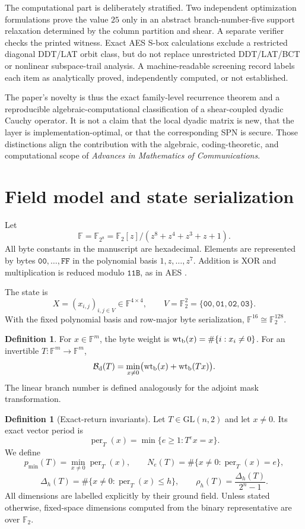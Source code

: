 \documentclass[10pt,reqno]{amsart}
\theoremstyle{plain}
\theoremstyle{remark}\newtheorem{remark}[theorem]{Remark}
\theoremstyle{definition}\newtheorem{definition}[theorem]{Definition}
\newcommand{\F}{\mathbb F}
\newcommand{\wt}{\operatorname{wt}}
\newcommand{\hex}[1]{\mathtt{#1}}
\newcommand{\Bn}{\mathcal B}
\begin{document}
The computational part is deliberately stratified.  Two independent optimization formulations prove the value \(25\) only in an abstract branch-number-five support relaxation determined by the column partition and shear.  A separate verifier checks the printed witness.  Exact AES S-box calculations exclude a restricted diagonal DDT/LAT orbit class, but do not replace unrestricted DDT/LAT/BCT or nonlinear subspace-trail analysis.  A machine-readable screening record labels each item as analytically proved, independently computed, or not established.

The paper's novelty is thus the exact family-level recurrence theorem and a reproducible algebraic-computational classification of a shear-coupled dyadic Cauchy operator.  It is not a claim that the local dyadic matrix is new, that the layer is implementation-optimal, or that the corresponding SPN is secure.  Those distinctions align the contribution with the algebraic, coding-theoretic, and computational scope of \emph{Advances in Mathematics of Communications}.
\section{Field model and state serialization}
Let
\[
\F=\F_{2^8}=\F_2[z]/(z^8+z^4+z^3+z+1).
\]
All byte constants in the manuscript are hexadecimal. Elements are represented by bytes $\hex{00},\ldots,\hex{FF}$ in the polynomial basis $1,z,\ldots,z^7$. Addition is XOR and multiplication is reduced modulo $\hex{11B}$, as in AES \cite{FIPS197,DaemenRijmen2002,DaemenRijmenWide2001}.

The state is
\[
X=(x_{i,j})_{i,j\in V}\in\F^{4\times4},\qquad V=\F_2^2=\{\hex{00},\hex{01},\hex{02},\hex{03}\}.
\]
With the fixed polynomial basis and row-major byte serialization, $\F^{16}\cong\F_2^{128}$.

\begin{definition}
For $x\in\F^m$, the byte weight is $\wt_{\rm b}(x)=\#\{i:x_i\ne0\}$. For an invertible $T:\F^m\to\F^m$,
\[
\Bn_{\rm d}(T)=\min_{x\ne0}\bigl(\wt_{\rm b}(x)+\wt_{\rm b}(Tx)\bigr).
\]
The linear branch number is defined analogously for the adjoint mask transformation.
\end{definition}

\begin{definition}[Exact-return invariants]\label{def:return-invariants}
Let $T\in\mathrm{GL}(n,2)$ and let $x\ne0$. Its exact vector period is
\[
\operatorname{per}_T(x)=\min\{e\ge1:T^ex=x\}.
\]
We define
\[
p_{\min}(T)=\min_{x\ne0}\operatorname{per}_T(x),
\qquad
N_e(T)=\#\{x\ne0:\operatorname{per}_T(x)=e\},
\]
\[
\Delta_h(T)=\#\{x\ne0:\operatorname{per}_T(x)\le h\},
\qquad
\rho_h(T)=\frac{\Delta_h(T)}{2^n-1}.
\]
All dimensions are labelled explicitly by their ground field. Unless stated otherwise, fixed-space dimensions computed from the binary representative are over $\mathbb F_2$.
\end{definition}
\end{document}
